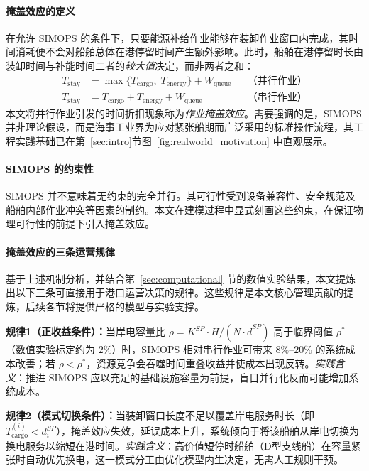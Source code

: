 \documentclass[UTF8, a4paper, 12pt]{ctexart}
\theoremstyle{plain}
\theoremstyle{definition}
\theoremstyle{remark}
\begin{document}
\paragraph{掩盖效应的定义}
在允许 SIMOPS 的条件下，只要能源补给作业能够在装卸作业窗口内完成，其时间消耗便不会对船舶总体在港停留时间产生额外影响。此时，船舶在港停留时长由装卸时间与补能时间二者的\emph{较大值}决定，而非两者之和：
\begin{equation*}
\begin{aligned}
T_{\text{stay}} &= \max\{T_{\text{cargo}},\; T_{\text{energy}}\} + W_{\text{queue}}
&& \text{（并行作业）} \\
T_{\text{stay}} &= T_{\text{cargo}} + T_{\text{energy}} + W_{\text{queue}}
&& \text{（串行作业）}
\end{aligned}
\end{equation*}
本文将并行作业引发的时间折扣现象称为\emph{作业掩盖效应}。需要强调的是，SIMOPS 并非理论假设，而是海事工业界为应对紧张船期而广泛采用的标准操作流程，其工程实践基础已在第~\ref{sec:intro}节图~\ref{fig:realworld_motivation} 中直观展示。
 
\paragraph{SIMOPS 的约束性}
SIMOPS 并不意味着无约束的完全并行。其可行性受到设备兼容性、安全规范及船舶内部作业冲突等因素的制约。本文在建模过程中显式刻画这些约束，在保证物理可行性的前提下引入掩盖效应。

\paragraph{掩盖效应的三条运营规律}
基于上述机制分析，并结合第~\ref{sec:computational} 节的数值实验结果，本文提炼出以下三条可直接用于港口运营决策的规律。这些规律是本文核心管理贡献的提炼，后续各节将提供严格的模型与实验支撑。

\textbf{规律1（正收益条件）：}当岸电容量比 $\rho = K^{SP} \cdot H / (N \cdot \bar{d}^{SP})$ 高于临界阈值 $\rho^*$（数值实验标定约为 $2\%$）时，SIMOPS 相对串行作业可带来 $8\%$--$20\%$ 的系统成本改善；若 $\rho < \rho^*$，资源竞争会吞噬时间重叠收益并使成本出现反转。\emph{实践含义}：推进 SIMOPS 应以充足的基础设施容量为前提，盲目并行化反而可能增加系统成本。

\textbf{规律2（模式切换条件）：}当装卸窗口长度不足以覆盖岸电服务时长（即 $T^{(i)}_{\text{cargo}} < d_i^{SP}$），掩盖效应失效，延误成本上升，系统倾向于将该船舶从岸电切换为换电服务以缩短在港时间。\emph{实践含义}：高价值短停时船舶（D型支线船）在容量紧张时自动优先换电，这一模式分工由优化模型内生决定，无需人工规则干预。
\end{document}
